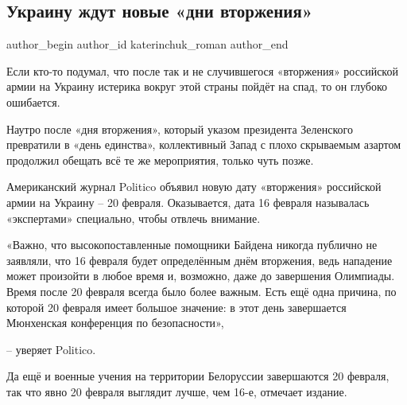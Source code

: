  
 
 
 
 
 
\subsection{Украину ждут новые «дни вторжения»}
\label{sec:18_02_2022.stz.news.ru.odnarodyna.1.ukrainu_zhdut_novyje_dni_vtorzhenia}
 
\ifcmt
 author_begin
   author_id katerinchuk_roman
 author_end
\fi

Если кто-то подумал, что после так и не случившегося «вторжения» российской
армии на Украину истерика вокруг этой страны пойдёт на спад, то он глубоко
ошибается.

Наутро после «дня вторжения», который указом президента Зеленского превратили в
«день единства», коллективный Запад с плохо скрываемым азартом продолжил
обещать всё те же мероприятия, только чуть позже.

Американский журнал Politico объявил новую дату «вторжения» российской армии на
Украину – 20 февраля. Оказывается, дата 16 февраля называлась «экспертами»
специально, чтобы отвлечь внимание.

\begin{zznagolos} 
«Важно, что высокопоставленные помощники Байдена никогда
публично не заявляли, что 16 февраля будет определённым днём вторжения, ведь
нападение может произойти в любое время и, возможно, даже до завершения
Олимпиады. Время после 20 февраля всегда было более важным. Есть ещё одна
причина, по которой 20 февраля имеет большое значение: в этот день завершается
Мюнхенская конференция по безопасности»,	
\end{zznagolos}

– уверяет Politico.

Да ещё и военные учения на территории Белоруссии завершаются 20 февраля, так
что явно 20 февраля выглядит лучше, чем 16-е, отмечает издание.


